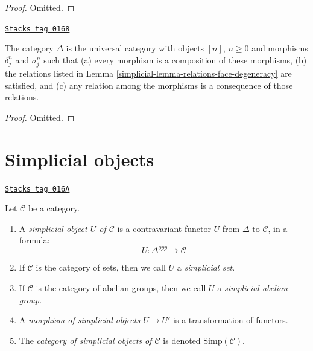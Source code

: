 \begin{proof}
Omitted.
\end{proof}

\begin{lemma}
\label{simplicial-lemma-face-degeneracy-category}
\href{https://stacks.math.columbia.edu/tag/0168}{\texttt{Stacks tag 0168}}

The category $\Delta$ is the universal category
with objects $[n]$, $n \geq 0$ and morphisms
$\delta^n_j$ and $\sigma^n_j$ such that (a) every morphism is
a composition of these morphisms, (b) the relations
listed in Lemma \ref{simplicial-lemma-relations-face-degeneracy} are satisfied,
and (c) any relation among the morphisms is a consequence of
those relations.
\end{lemma}

\begin{proof}
Omitted.
\end{proof}

\section{Simplicial objects}
\label{simplicial-section-simplicial-object}
\begin{definition}
\label{simplicial-definition-simplicial-object}
\href{https://stacks.math.columbia.edu/tag/016A}{\texttt{Stacks tag 016A}}

Let $\mathcal{C}$ be a category.
\begin{enumerate}
\item A {\it simplicial object $U$ of $\mathcal{C}$}
is a contravariant functor $U$ from $\Delta$ to
$\mathcal{C}$, in a formula:
$$
U : \Delta^{opp} \longrightarrow \mathcal{C}
$$
\item If $\mathcal{C}$ is the category of sets, then we call
$U$ a {\it simplicial set}.
\item If $\mathcal{C}$ is the category of abelian groups,
then we call $U$ a {\it simplicial abelian group}.
\item A {\it morphism of simplicial objects $U \to U'$}
is a transformation of functors.
\item The {\it category of simplicial objects of $\mathcal{C}$}
is denoted $\text{Simp}(\mathcal{C})$.
\end{enumerate}
\end{definition}

